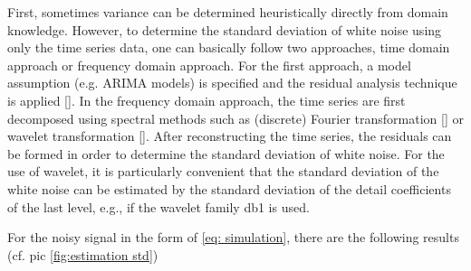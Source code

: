 \documentclass[oneside]{article}
\theoremstyle{plain}%
\theoremstyle{definition}
\begin{document}
First, sometimes variance can be determined heuristically directly from domain knowledge. 
However, to determine the standard deviation of white noise using only the time series data, one can basically follow two approaches, time domain approach or frequency domain approach. For the first approach, a model assumption (e.g. ARIMA models) is specified and the residual analysis technique is applied [\cite{chitturi1974distribution}]. 
In the frequency domain approach, the time series are first decomposed using spectral methods such as (discrete) Fourier transformation [\cite{sauer1992noise}] or wavelet transformation [\cite{heil1989continuous,donoho1994ideal,jansen2012noise}]. After reconstructing the time series, the residuals can be formed in order to determine the standard deviation of white noise. For the use of wavelet, it is particularly convenient that the standard deviation of the white noise can be estimated by the standard deviation of the detail coefficients of the last level, e.g., if the wavelet family db1 is used.

For the noisy signal in the form of \ref{eq: simulation},  there are the following results (cf. pic \ref{fig:estimation std})



\end{document}
